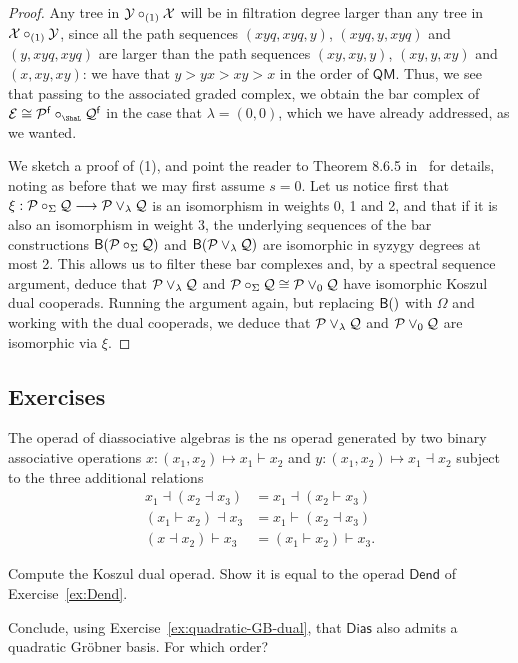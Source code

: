 \begin{proof}
Any tree in $\mathcal{Y}\circ_{(1)}\mathcal{X}$ will be
in filtration degree larger than any tree
in $\mathcal{X}\circ_{(1)}\mathcal{Y}$, since all the path 
sequences
$(xyq,xyq,y)$, $(xyq,y,xyq)$ and $(y,xyq,xyq)$
are larger than the path sequences 
$(xy,xy,y)$, $(xy,y,xy)$ and $(x,xy,xy)$:
we have that $y > yx > xy > x$ in the order of 
$\mathsf{QM}$. Thus, we see that passing
to the associated graded complex, we obtain
the bar complex of $\mathcal E\cong \PP^\f\circ_\Sha\QQ^\f$
in the case that $\lambda = (0,0)$, which
we have already addressed, as we wanted. 

We sketch a proof of (1), and point
the reader to Theorem 8.6.5 in~\cite{Loday2012}
for details, noting as before that we
may first assume $s=0$.
Let us notice first that
$\xi: {\mathcal{P}}\circ_\Sigma\mathcal{Q}\longrightarrow
 {\mathcal{P}}\vee_\lambda \mathcal{Q}$ is an isomorphism in
 weights 0, 1 and 2, and that if it is also
 an isomorphism in weight 3, the underlying
 sequences of the bar
 constructions $\mathsf{B}({\mathcal{P}}\circ_\Sigma\mathcal{Q})$
 and $\mathsf{B}({\mathcal{P}}\vee_\lambda \mathcal{Q})$ are isomorphic
 in syzygy degrees at most 2. This allows us
 to filter these bar complexes and, by a 
 spectral sequence argument, deduce that
 ${\mathcal{P}}\vee_\lambda \mathcal{Q}$ and ${\mathcal{P}}\circ_\Sigma\mathcal{Q}\cong
  {\mathcal{P}}\vee_0 \mathcal{Q}$ have isomorphic Koszul dual
 cooperads. Running the argument again, but
 replacing $\B$ with $\Omega$ and 
 working with the dual cooperads, we deduce
 that  ${\mathcal{P}}\vee_\lambda \mathcal{Q}$ and ${\mathcal{P}}\vee_0 \mathcal{Q}$ are isomorphic via $\xi$.
\end{proof}
\newpage


\subsection{Exercises}

\begin{question}
The operad of diassociative algebras is the
ns operad generated by two binary 
associative operations
$x: (x_1,x_2) \longmapsto x_1\vdash x_2$ and
$y: (x_1,x_2) \longmapsto x_1\dashv x_2$ subject
to the three additional relations
\begin{align*}
 x_1 \dashv (x_2 \dashv x_3) &= x_1 \dashv (x_2 \vdash x_3) \\
 (x_1 \vdash x_2) \dashv x_3 &= x_1 \vdash (x_2 \dashv x_3) \\
(x \dashv x_2) \vdash x_3 &= (x_1 \vdash x_2) \vdash x_3.
\end{align*}
\begin{tenumerate}
\item Compute the Koszul dual operad. Show
it is equal to the operad $\mathsf{Dend}$
of Exercise~\ref{ex:Dend}.
\item Conclude, using Exercise~\ref{ex:quadratic-GB-dual}, that $\mathsf{Dias}$ also admits
a quadratic Gr\"obner basis. For which
order?
\end{tenumerate}
\end{question}

